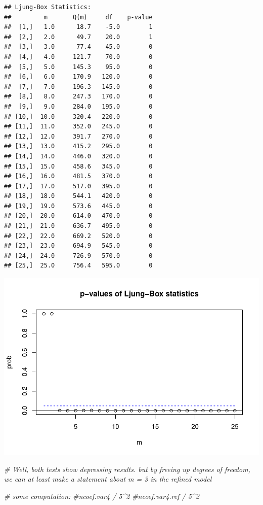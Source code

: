 \documentclass[12pt,a4paper]{article}
\newenvironment{Shaded}{\begin{snugshade}}{\end{snugshade}}
\newcommand{\CommentTok}[1]{\textcolor[rgb]{0.56,0.35,0.01}{\textit{#1}}}
\begin{document}
\begin{verbatim}
## Ljung-Box Statistics:  
##         m       Q(m)     df    p-value
##  [1,]   1.0      18.7    -5.0        1
##  [2,]   2.0      49.7    20.0        1
##  [3,]   3.0      77.4    45.0        0
##  [4,]   4.0     121.7    70.0        0
##  [5,]   5.0     145.3    95.0        0
##  [6,]   6.0     170.9   120.0        0
##  [7,]   7.0     196.3   145.0        0
##  [8,]   8.0     247.3   170.0        0
##  [9,]   9.0     284.0   195.0        0
## [10,]  10.0     320.4   220.0        0
## [11,]  11.0     352.0   245.0        0
## [12,]  12.0     391.7   270.0        0
## [13,]  13.0     415.2   295.0        0
## [14,]  14.0     446.0   320.0        0
## [15,]  15.0     458.6   345.0        0
## [16,]  16.0     481.5   370.0        0
## [17,]  17.0     517.0   395.0        0
## [18,]  18.0     544.1   420.0        0
## [19,]  19.0     573.6   445.0        0
## [20,]  20.0     614.0   470.0        0
## [21,]  21.0     636.7   495.0        0
## [22,]  22.0     669.2   520.0        0
## [23,]  23.0     694.9   545.0        0
## [24,]  24.0     726.9   570.0        0
## [25,]  25.0     756.4   595.0        0
\end{verbatim}

\includegraphics{solution_exercise_6_files/figure-latex/2_f-2.pdf}

\begin{Shaded}
\begin{Highlighting}[]
\CommentTok{# Well, both tests show depressing results. but by freeing up degrees of freedom, we can at least make a statement about m = 3 in the refined model}

\CommentTok{# some computation:}
\CommentTok{#ncoef.var4 / 5^2}
\CommentTok{#ncoef.var4.ref / 5^2}
\end{Highlighting}
\end{Shaded}
\end{document}
